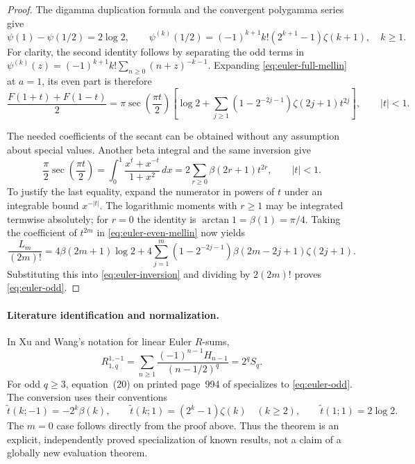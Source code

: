 \begin{proof}
The digamma duplication formula and the convergent polygamma series
give
\[
\psi(1)-\psi(1/2)=2\log2,
\qquad
\psi^{(k)}(1/2)
=(-1)^{k+1}k!(2^{k+1}-1)\zeta(k+1),\quad k\ge1.
\]
For clarity, the second identity follows by separating the odd terms
in \(\psi^{(k)}(z)=(-1)^{k+1}k!\sum_{n\ge0}(n+z)^{-k-1}\).
Expanding \eqref{eq:euler-full-mellin} at \(a=1\), its even part
is therefore
\begin{equation}
\frac{F(1+t)+F(1-t)}2
=\pi\sec\!\left(\frac{\pi t}{2}\right)
 \left[\log2+\sum_{j\ge1}
 (1-2^{-2j-1})\zeta(2j+1)t^{2j}\right],
\qquad |t|<1.
\label{eq:euler-even-mellin}
\end{equation}

The needed coefficients of the secant can be obtained without any
assumption about special values. Another beta integral and the same
inversion give
\[
\frac{\pi}{2}\sec\!\left(\frac{\pi t}{2}\right)
=\int_0^1\frac{x^t+x^{-t}}{1+x^2}\,dx
=2\sum_{r\ge0}\beta(2r+1)t^{2r},\qquad |t|<1.
\]
To justify the last equality, expand the numerator in powers of \(t\)
under an integrable bound \(x^{-|t|}\). The logarithmic moments
with \(r\ge1\) may be integrated termwise absolutely; for \(r=0\)
the identity is \(\arctan1=\beta(1)=\pi/4\).
Taking the coefficient of \(t^{2m}\) in
\eqref{eq:euler-even-mellin} now yields
\[
\frac{L_m}{(2m)!}
=4\beta(2m+1)\log2
 +4\sum_{j=1}^{m}(1-2^{-2j-1})
       \beta(2m-2j+1)\zeta(2j+1).
\]
Substituting this into \eqref{eq:euler-inversion} and dividing by
\(2(2m)!\) proves \eqref{eq:euler-odd}.
\end{proof}

\paragraph{Literature identification and normalization.}
In Xu and Wang's notation for linear Euler \(R\)-sums,
\[
R_{1,q}^{1,-1}
=\sum_{n\ge1}\frac{(-1)^{n-1}H_{n-1}}{(n-1/2)^q}
=2^qS_q.
\]
For odd \(q\ge3\), equation~(20) on printed page~994 of
\cite{XuWang} specializes to \eqref{eq:euler-odd}.
The conversion uses their conventions
\[
\widetilde t(k;-1)=-2^k\beta(k),\qquad
\widetilde t(k;1)=(2^k-1)\zeta(k)\quad(k\ge2),
\qquad \widetilde t(1;1)=2\log2.
\]
The \(m=0\) case follows directly from the proof above. Thus the
theorem is an explicit, independently proved specialization of known
results, not a claim of a globally new evaluation theorem.

